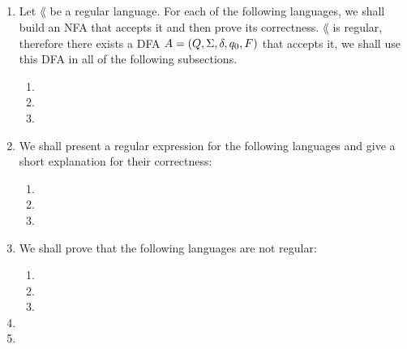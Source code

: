 \documentclass{article}
\title{
    \textmd{\bd{\hmwkClass:\ \hmwkTitle}}\\
}
\begin{document}
\maketitle

\begin{enumerate}
      \item Let \(\lang\)  be a regular language. For each of the following languages,
            we shall build an NFA that accepts it and then prove its correctness.
            \(\lang\) is regular, therefore there exists a DFA \(A=(Q, \Sigma, \delta, q_0, F)\)
            that accepts it, we shall use this DFA in all of the following subsections.

            \begin{enumerate}
                  \item 
                  \item 
                  \item 
            \end{enumerate}

            \pagebreak

      \item We shall present a regular expression for the following languages and give a short
            explanation for their correctness:

            \begin{enumerate}
                  \item 
                  \item 
                  \item 
            \end{enumerate}

            \pagebreak

      \item We shall prove that the following languages are not regular:
            \begin{enumerate}
                  \item 
                  \item 
                  \item 
            \end{enumerate}

            \pagebreak

      \item 

      \item 


\end{enumerate}
\end{document}
